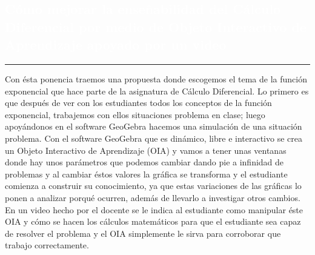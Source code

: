 \begin{titlepage}
\pagecolor{white}
\newcommand{\R}{\ensuremath{\mathbb{R}}}
\BgThispage
{}
\vspace*{-1.1cm}
\noindent
\def\titulo#1{\section{#1}}

\section{\bf\large\textcolor{white}{C\'omo mejorar la ense\~nabilidad del C\'alculo Diferencial por medio de Objeto Interactivo de Aprendizaje apoyado por un video}}
\vspace*{2cm}\par
\noindent

\begin{minipage}{0.5\linewidth}
\begin{minipage}{0.45\linewidth}
    \begin{flushright}
        \printauthor
    \end{flushright}
\end{minipage} \hspace{-3pt}
%
\begin{minipage}{0.02\linewidth}
   \color{ptctitle} \rule{1pt}{245pt}
\end{minipage} 
\end{minipage}
\hspace*{-4.5cm}
\begin{minipage}{0.85\linewidth}
\begin{minipage}{0.85\linewidth}
\footnotesize
\vspace{5pt}
    \begin{resumen}
  
Con \'esta ponencia traemos una propuesta donde escogemos el tema de la funci\'on exponencial que hace parte de la asignatura de C\'alculo Diferencial. Lo primero es que despu\'es de ver con los estudiantes todos los conceptos de la funci\'on exponencial, trabajemos con ellos situaciones problema en clase; luego apoy\'andonos en el software GeoGebra  hacemos una simulaci\'on de una situaci\'on problema. Con el software GeoGebra que es din\'amico, libre e interactivo se crea un Objeto Interactivo de Aprendizaje (OIA)  y vamos a tener unas ventanas donde hay unos par\'ametros que podemos cambiar dando pie a infinidad de problemas y al cambiar \'estos valores la gr\'afica se transforma y el estudiante comienza a construir su conocimiento, ya que estas variaciones de las gr\'aficas lo ponen a analizar porqu\'e ocurren, adem\'as de llevarlo a investigar otros cambios. En un video hecho por el docente se le indica al estudiante como manipular \'este OIA y c\'omo se hacen los c\'alculos matem\'aticos para que el estudiante sea capaz de resolver el problema y el OIA simplemente le sirva para corroborar que trabajo correctamente.


\end{resumen}
\end{minipage}
\end{minipage}
\end{titlepage}
